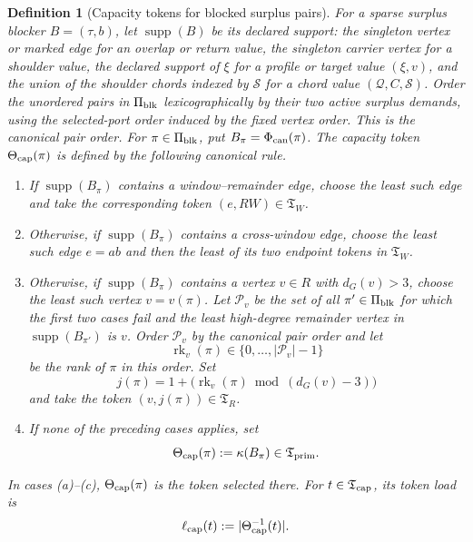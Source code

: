 \documentclass[11pt]{article}
\newtheorem{definition}[theorem]{Definition}
\begin{document}
\begin{definition}[Capacity tokens for blocked surplus pairs]
For a sparse surplus blocker \(B=(\tau,b)\), let
\(\operatorname{supp}(B)\) be its declared support: the singleton vertex or
marked edge for an overlap or return value, the singleton carrier vertex for a
shoulder value, the declared support of \(\xi\) for a profile or target value
\((\xi,v)\), and the union of the shoulder chords indexed by \(\mathcal S\)
for a chord value \((\mathcal Q,C,\mathcal S)\).  Order the unordered pairs in
\(\Pi_{\rm blk}\)
lexicographically by their two active surplus demands, using the selected-port
order induced by the fixed vertex order.  This is the \emph{canonical pair
order}.  For \(\pi\in\Pi_{\rm blk}\), put \(B_\pi=\Phi_{\rm can}(\pi)\).  The
\emph{capacity token}
\(\Theta_{\rm cap}(\pi)\) is defined by the following canonical rule.
\begin{enumerate}[label=(\alph*), leftmargin=2.2em]
\item If \(\operatorname{supp}(B_\pi)\) contains a window--remainder edge, choose
the least such edge and take the corresponding token \((e,RW)\in\mathfrak T_W\).
\item Otherwise, if \(\operatorname{supp}(B_\pi)\) contains a cross-window edge,
choose the least such edge \(e=ab\) and then the least of its two endpoint
tokens in \(\mathfrak T_W\).
\item Otherwise, if \(\operatorname{supp}(B_\pi)\) contains a vertex \(v\in R\)
with \(d_G(v)>3\), choose the least such vertex \(v=v(\pi)\).  Let
\(\mathcal P_v\) be the set of all \(\pi'\in\Pi_{\rm blk}\) for which the first
two cases fail and the least high-degree remainder vertex in
\(\operatorname{supp}(B_{\pi'})\) is \(v\).  Order \(\mathcal P_v\) by the
canonical pair order and let
\[
\operatorname{rk}_v(\pi)\in\{0,\ldots,|\mathcal P_v|-1\}
\]
be the rank of \(\pi\) in this order.  Set
\[
j(\pi)=1+\bigl(\operatorname{rk}_v(\pi)\bmod (d_G(v)-3)\bigr)
\]
and take the token \((v,j(\pi))\in\mathfrak T_R\).
\item If none of the preceding cases applies, set
\[
\Theta_{\rm cap}(\pi):=\kappa(B_\pi)\in\mathfrak T_{\rm prim}.
\]
\end{enumerate}
In cases (a)--(c), \(\Theta_{\rm cap}(\pi)\) is the token selected there.
For \(t\in\mathfrak T_{\rm cap}\), its \emph{token load} is
\[
\ell_{\rm cap}(t):=|\Theta_{\rm cap}^{-1}(t)|.
\]
\end{definition}
\end{document}
